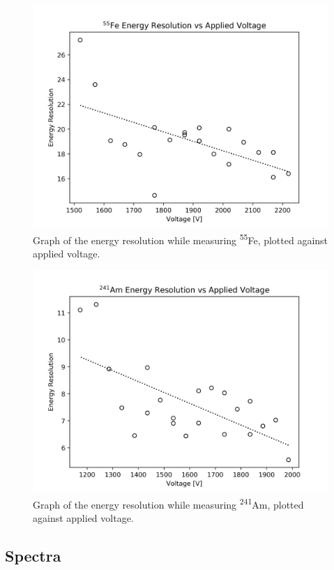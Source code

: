 \begin{figure}[H]
  \centering
  \includegraphics[width=12cm]{EResVsVFe.png}
  \caption{Graph of the energy resolution while measuring \textsuperscript{55}Fe, plotted against applied voltage.}
  \label{fig:EResVsVFe}
\end{figure}

\begin{figure}[H]
  \centering
  \includegraphics[width=12cm]{EResVsVAm.png}
  \caption{Graph of the energy resolution while measuring \textsuperscript{241}Am, plotted against applied voltage.}
  \label{fig:EResVsVAm}
\end{figure}

\subsection{Spectra}

